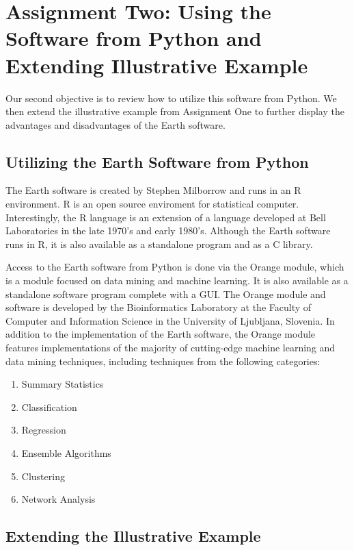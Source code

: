 

\graphicspath{{C:/Documents and Settings/amcelhinney/My Documents/GitHub/MCS507ProjectTwo/tex/include/}}

\section{Assignment Two: Using the Software from Python and Extending Illustrative Example} %
\label{sec: First}
Our second objective is to review how to utilize this software from Python. We then extend the illustrative example from Assignment One to further display the advantages and disadvantages of the Earth software.

\subsection{Utilizing the Earth Software from Python} %
\label{sub:methoda}
The Earth software is created by Stephen Milborrow and runs in an R environment. R is an open source enviroment for statistical computer. Interestingly, the R language is an extension of a language developed at Bell Laboratories in the late 1970's and early 1980's. Although the Earth software runs in R, it is also available as a standalone program and as a C library. 

Access to the Earth software from Python is done via the Orange module, which is a module focused on data mining and machine learning. It is also available as a standalone software program complete with a GUI. The Orange module and software is developed by the Bioinformatics Laboratory at the Faculty of Computer and Information Science in the University of Ljubljana, Slovenia. In addition to the implementation of the Earth software, the Orange module features implementations of the majority of cutting-edge machine learning and data mining techniques, including techniques from the following categories:

\begin{enumerate}
\item Summary Statistics
\item Classification
\item Regression
\item Ensemble Algorithms
\item Clustering
\item Network Analysis
\end{enumerate}

\subsection{Extending the Illustrative Example} 

